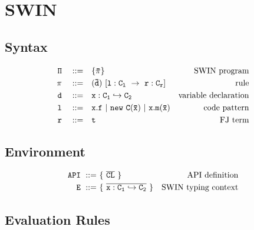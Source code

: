\documentclass[letterpaper]{article}
\begin{document}
\section{SWIN}
\subsection{Syntax}
\begin{align*}
  \tt \Pi \quad ::=\quad  &\tt  \{\bar{\pi}\}                     & \text{SWIN program}\\
  \tt \pi \quad ::=\quad  &\tt  (\bar{d})\ [l:C_l\ \rightarrow\ r:C_r]    & \text{rule}\\
  \tt d   \quad ::=\quad  &\tt  x:C_1\hookrightarrow C_2          & \text{variable declaration}\\
  \tt l   \quad ::=\quad  &\tt  x.f ~ | ~ new\ C(\bar{x}) ~|~ x.m(\bar{x})  &\text{code pattern}\\
  \tt r   \quad ::=\quad  &\tt  t                                 & \text{FJ term}
\end{align*}

\subsection{Environment}
\begin{align*}
 \tt API ~ ::=&\tt ~ \{ ~ \overline{CL} ~ \}       & \text{API definition}\\
 \tt E ~   ::=&\tt ~ \{~ \overline{x:C_1\hookrightarrow C_2}~\}     & \text{SWIN typing context}\\
\end{align*}


\subsection{Evaluation Rules}
\begin{center}
                             
\DP
\end{center}
\vspace{2pt}

\begin{center}
                             
\DP
\end{center}
\vspace{2pt}
\end{document}
